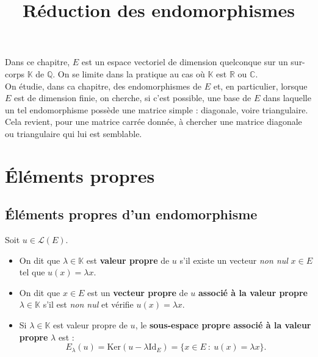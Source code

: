 \documentclass[french]{article}
\title{Réduction des endomorphismes}
\date{}
\newcommand{\Q}{\mathbb{Q}}
\newcommand{\R}{\mathbb{R}}
\newcommand{\C}{\mathbb{C}}
\newcommand{\K}{\mathbb{K}}
\renewcommand{\ker}{\text{Ker}}
\newcommand{\Id}{\text{Id}}
\theoremstyle{plain}
\theoremstyle{definition}
\theoremstyle{remark}
\begin{document}
	\tableofcontents
	
	\newpage
	\maketitle
	
	Dans ce chapitre, $E$ est un espace vectoriel de dimension quelconque sur un sur-corps $\K$ de $\Q$. On se limite dans la pratique au cas où $\K$ est $\R$ ou $\C$.\\
	On étudie, dans ca chapitre, des endomorphismes de $E$ et, en particulier, lorsque $E$ est de dimension finie, on cherche, si c'est possible, une base de $E$ dans laquelle un tel endomorphisme possède une matrice simple : diagonale, voire triangulaire. \\
	Cela revient, pour une matrice carrée donnée, à chercher une matrice diagonale ou triangulaire qui lui est semblable.
	
	\section{Éléments propres}
	
	\subsection{Éléments propres d'un endomorphisme}
	
	Soit $u\in\mathcal{L}(E)$.
	
	\begin{dfn}
		\begin{itemize}
			\item On dit que $\lambda\in\K$ est \textbf{valeur propre} de $u$ s'il existe un vecteur \textit{non nul} $x\in E$ tel que $u(x)=\lambda x$.
			\item On dit que $x\in E$ est un \textbf{vecteur propre} de $u$ \textbf{associé à la valeur propre} $\lambda\in\K$ s'il est \textit{non nul} et vérifie $u(x)=\lambda x$.
			\item Si $\lambda\in\K$ est valeur propre de $u$, le \textbf{sous-espace propre associé à la valeur propre} $\lambda$ est : $$E_\lambda(u)=\ker(u-\lambda\Id_E)=\{x\in E\ : \ u(x)=\lambda x\}.$$
		\end{itemize}
	\end{dfn}
	
\end{document}

